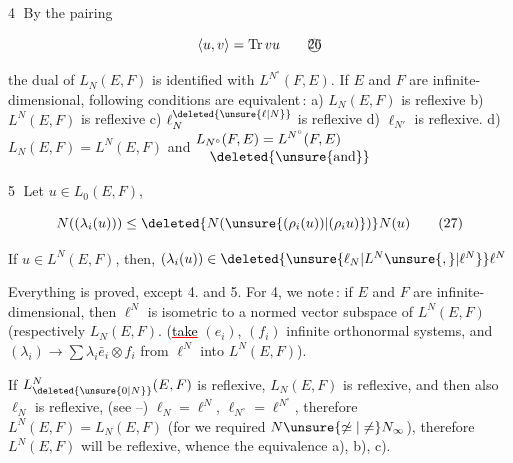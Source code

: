 
\textcircled{4} By the pairing 

\[
\langle u,v\rangle=\operatorname{Tr}vu\tag*{\textcircled{26}}
\]

the dual of $L_N(E,F)$ is identified with $L^{N^\circ}(F,E)$. If $E$ and $F$ are infinite-dimensional,   following conditions are equivalent\,: a) $L_N(E,F)$ is reflexive  b) $L^N(E,F)$ is reflexive c) $\ell^{\deleted{\unsure{\ell|N}}}_{N}$ is reflexive  d) $\ell_{N'}$ is reflexive.   d) $L_N(E,F)=L^N(E,F)$ and $\begin{aligned}&L_{N^\circ}(F,E)=L^{N^\circ}(F,E)\\[-0.5ex]&\quad\text{\deleted{\unsure{and}}}\end{aligned}$

\textcircled{5}  Let $u\in L_0(E,F)$,  

\[
N((\lambda_i(u)))\leq\deleted{N(\unsure{(\rho_i(u))|(\rho_i u)})}N(u)\tag*{(27)}
\]

If $u\in L^N(E,F)$,  then, $(\lambda_i(u))\in\deleted{\unsure{\ell_N|L^N\unsure{,}|\ell^N}}\ell^N$ 

Everything is proved, except 4.  and 5. For 4, we note\,: if $E$ and $F$ are infinite-dimensional, then $\ell^N$  is isometric to a normed vector subspace of $L^N(E,F)$ (respectively $L_N(E,F)$. (\textcolor{red}{\uline{\textcolor{black}{take}}} $(e_i)$, $(f_i)$ infinite orthonormal systems, and $(\lambda_i)\to\sum\lambda_i\bar e_i\otimes f_i$ from $\ell^N$ into $L^N(E,F)$). 

If $L^N_{\deleted{\unsure{0|N}}}(E,F)$ is reflexive, $L_N(E,F)$ is reflexive, and then also $\ell_N$ is reflexive,  (see --) $\ell_N=\ell^N$, $\ell_{N^\circ}=\ell^{N^\circ}$, therefore $L^N(E,F)=L_N(E,F)$ (for we  required $N\unsure{\not\simeq|\neq}N_\infty$), therefore $L^N(E,F)$ will be reflexive, whence the equivalence a), b), c).

